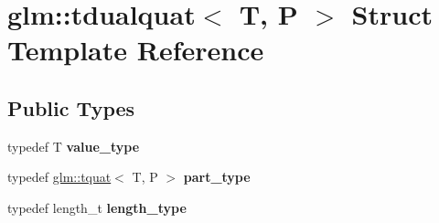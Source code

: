 \hypertarget{structglm_1_1tdualquat}{\section{glm\-:\-:tdualquat$<$ T, P $>$ Struct Template Reference}
\label{structglm_1_1tdualquat}
}
\subsection*{Public Types}
\begin{DoxyCompactItemize}
\item 
\hypertarget{structglm_1_1tdualquat_afcff3aadbc6e5c5672e2af653a5e401c}{typedef T {\bfseries value\-\_\-type}}\label{structglm_1_1tdualquat_afcff3aadbc6e5c5672e2af653a5e401c}

\item 
\hypertarget{structglm_1_1tdualquat_a496a3e08262a28863cf7b0609eee7e5b}{typedef \hyperlink{structglm_1_1tquat}{glm\-::tquat}$<$ T, P $>$ {\bfseries part\-\_\-type}}\label{structglm_1_1tdualquat_a496a3e08262a28863cf7b0609eee7e5b}

\item 
\hypertarget{structglm_1_1tdualquat_a8100706ca94a1aa6611874787a9be0ca}{typedef length\-\_\-t {\bfseries length\-\_\-type}}\label{structglm_1_1tdualquat_a8100706ca94a1aa6611874787a9be0ca}

\end{DoxyCompactItemize}
